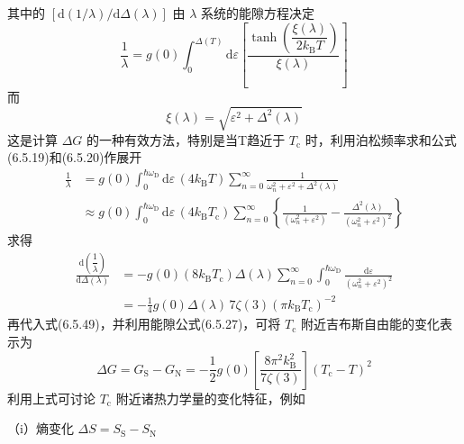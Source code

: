 其中的 $\left[\mathrm{d}(1/\lambda)/\mathrm{d}\Delta(\lambda)\right]$ 由 $\lambda$ 系统的能隙方程决定
\begin{equation}
  \frac{1}{\lambda}=g(0)\int_{0}^{\Delta(T)}\mathrm{d}\varepsilon
  \left[\frac{\tanh\left(\dfrac{\xi(\lambda)}{2k_{\mathrm{B}}T}\right)}{\xi(\lambda)}\right]
\end{equation}
而
\begin{equation}
  \xi(\lambda)=\sqrt{\varepsilon^{2}+\Delta^{2}(\lambda)}
\end{equation}
这是计算 $\Delta G$ 的一种有效方法，特别是当T趋近于 $T_{\mathrm{c}}$ 时，利用泊松频率求和公式(6.5.19)和(6.5.20)作展开
\begin{equation}
\begin{aligned}
  \frac{1}{\lambda}&=g(0)\int_{0}^{\hbar\omega_{\mathrm{D}}}\mathrm{d}\varepsilon\,
  \left(4k_{\mathrm{B}}T\right)\sum_{n=0}^{\infty}
  \frac{1}{\omega_{n}^{2}+\varepsilon^{2}+\Delta^{2}(\lambda)}\\
  &\approx g(0)\int_{0}^{\hbar\omega_{\mathrm{D}}}\mathrm{d}\varepsilon\,
  \left(4k_{\mathrm{B}}T_{\mathrm{c}}\right)\sum_{n=0}^{\infty}
  \left\{\frac{1}{\left(\omega_{n}^{2}+\varepsilon^{2}\right)}
  -\frac{\Delta^{2}(\lambda)}{\left(\omega_{n}^{2}+\varepsilon^{2}\right)^{2}}\right\}
\end{aligned}
\end{equation}
求得
\begin{equation}
\begin{aligned}
  \frac{\mathrm{d}\left(\dfrac{1}{\lambda}\right)}{\mathrm{d}\Delta(\lambda)}
  &=-g(0)\left(8k_{\mathrm{B}}T_{\mathrm{c}}\right)\Delta(\lambda)
  \sum_{n=0}^{\infty}\int_{0}^{\hbar\omega_{\mathrm{D}}}
  \frac{\mathrm{d}\varepsilon}{\left(\omega_{n}^{2}+\varepsilon^{2}\right)^{2}}\\
  &=-\frac{1}{4}g(0)\Delta(\lambda)\,7\zeta(3)
  \left(\pi k_{\mathrm{B}}T_{\mathrm{c}}\right)^{-2}
\end{aligned}
\end{equation}
再代入式(6.5.49)，并利用能隙公式(6.5.27)，可将 $T_{\mathrm{c}}$ 附近吉布斯自由能的变化表示为
\begin{equation}
  \Delta G=G_{\mathrm{S}}-G_{\mathrm{N}}
  =-\frac{1}{2}g(0)\left[\frac{8\pi^{2}k_{\mathrm{B}}^{2}}{7\zeta(3)}\right]
  \left(T_{\mathrm{c}}-T\right)^{2}
\end{equation}
利用上式可讨论 $T_{\mathrm{c}}$ 附近诸热力学量的变化特征，例如

（i）熵变化 $\Delta S=S_{\mathrm{S}}-S_{\mathrm{N}}$

